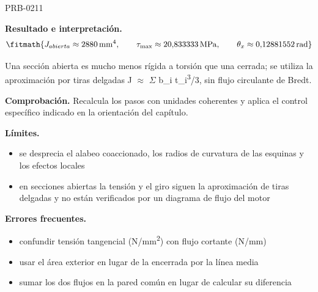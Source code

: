 \begin{studiumworked}{PRB-0211}
\begin{enumerate}
\end{enumerate}

\textbf{Resultado e interpretación.}\[\fitmath{J_{abierta} \approx 2880\,\mathrm{mm}^{4},\qquad \tau_{\max} \approx 20{,}833333\,\mathrm{MPa},\qquad \theta_x \approx 0{,}12881552\,\mathrm{rad}}\]

Una sección abierta es mucho menos rígida a torsión que una cerrada; se utiliza la aproximación por tiras delgadas J \ensuremath{\approx} \ensuremath{\Sigma} b\_i t\_i\textsuperscript{3}/3, sin flujo circulante de Bredt.

\par\textbf{Comprobación.} Recalcula los pasos con unidades coherentes y aplica el control específico indicado en la orientación del capítulo.

\textbf{Límites.}\begin{itemize}\item se desprecia el alabeo coaccionado, los radios de curvatura de las esquinas y los efectos locales
\item en secciones abiertas la tensión y el giro siguen la aproximación de tiras delgadas y no están verificados por un diagrama de flujo del motor\end{itemize}

\textbf{Errores frecuentes.}\begin{itemize}\item confundir tensión tangencial (N/mm\textsuperscript{2}) con flujo cortante (N/mm)
\item usar el área exterior en lugar de la encerrada por la línea media
\item sumar los dos flujos en la pared común en lugar de calcular su diferencia\end{itemize}

\end{studiumworked}

\Needspace{.3\textheight}


